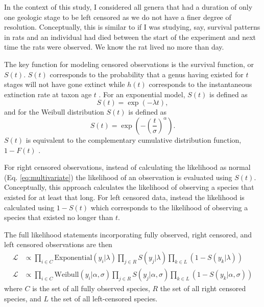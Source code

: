 \documentclass[12pt,letterpaper]{article}
\begin{document}
In the context of this study, I considered all genera that had a duration of only one geologic stage to be left censored as we do not have a finer degree of resolution. Conceptually, this is similar to if I was studying, say, survival patterns in rats and an individual had died between the start of the experiment and next time the rats were observed. We know the rat lived no more than day.

The key function for modeling censored observations is the survival function, or \(S(t)\). \(S(t)\) corresponds to the probability that a genus having existed for \(t\) stages will not have gone extinct while \(h(t)\) corresponds to the instantaneous extinction rate at taxon age \(t\) \cite{Klein2003}. For an exponential model, \(S(t)\) is defined as
\begin{equation}
  S(t) = \exp(-\lambda t),
\end{equation}
and for the Weibull distribution \(S(t)\) is defined as
\begin{equation}
  S(t) = \exp\left(-\left(\frac{t}{\sigma}\right)^{\alpha}\right).
\end{equation}
\(S(t)\) is equivalent to the complementary cumulative distribution function, \(1 - F(t)\) \citep{Klein2003}. 

For right censored observations, instead of calculating the likelihood as normal (Eq. \ref{eq:multivariate}) the likelihood of an observation is evaluated using \(S(t)\). Conceptually, this approach calculates the likelihood of observing a species that existed for at least that long. For left censored data, instead the likelihood is calculated using \(1 - S(t)\) which corresponds to the likelihood of observing a species that existed no longer than \(t\).

The full likelihood statements incorporating fully observed, right censored, and left censored observations are then
\begin{equation}
  \begin{aligned}
    \mathcal{L} &\propto \prod_{i \in C} \mathrm{Exponential}(y_{i} | \lambda) \prod_{j \in R} S(y_{j} | \lambda) \prod_{k \in L} \left(1 - S(y_{k} | \lambda)\right) \\
    \mathcal{L} &\propto \prod_{i \in C} \mathrm{Weibull}(y_{i} | \alpha, \sigma) \prod_{j \in R} S(y_{j} | \alpha, \sigma) \prod_{k \in L} \left(1 - S(y_{k} | \alpha, \sigma)\right)
  \end{aligned}
  \label{eq:censored_likelihood}
\end{equation}
where \(C\) is the set of all fully observed species, \(R\) the set of all right censored species, and \(L\) the set of all left-censored species.
\end{document}
